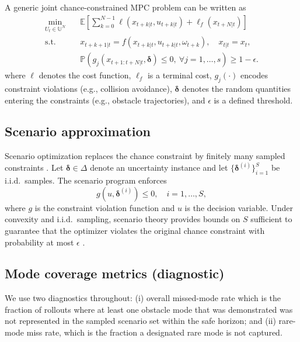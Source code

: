 \documentclass[letterpaper,10pt,conference]{ieeeconf}
\begin{document}
A generic joint chance-constrained MPC problem can be written as
\begin{subequations}\label{eq:cc_mpc}
\begin{align}
\min_{U_t\in\mathbb{U}^N}\quad &
\mathbb{E}\!\left[\sum_{k=0}^{N-1} \ell(x_{t+k|t},u_{t+k|t}) + \ell_f(x_{t+N|t})\right] \\
\text{s.t.}\quad &
x_{t+k+1|t}=f(x_{t+k|t},u_{t+k|t},\omega_{t+k}),\quad x_{t|t}=x_t,\\
& \mathbb{P}\!\left(g_j(x_{t+1:t+N|t},\boldsymbol{\delta})\le 0,\ \forall j=1,\dots,s\right) \ge 1-\epsilon.
\end{align}
\end{subequations}
where $\ell$ denotes the cost function, $\ell_f$ is a terminal cost, $g_j(\cdot)$ encodes constraint violations (e.g., collision avoidance), $\boldsymbol{\delta}$ denotes the random quantities entering the constraints (e.g., obstacle trajectories), and $\epsilon$ is a defined threshold.

\subsection{Scenario approximation}

Scenario optimization replaces the chance constraint by finitely many sampled constraints \cite{Cal2006ScenarioApproach,Ca2018ScenarioTheory}. Let $\boldsymbol{\delta}\in\Delta$ denote an uncertainty instance and let $\{\boldsymbol{\delta}^{(i)}\}_{i=1}^S$ be i.i.d.\ samples. The scenario program enforces
\begin{equation}\label{eq:scenario_generic}
g(u,\boldsymbol{\delta}^{(i)}) \le 0,\quad i=1,\dots,S,
\end{equation}
where $g$ is the constraint violation function and $u$ is the decision variable. Under convexity and i.i.d.\ sampling, scenario theory provides bounds on $S$ sufficient to guarantee that the optimizer violates the original chance constraint with probability at most $\epsilon$ \cite{Cal2006ScenarioApproach,Ca2018ScenarioTheory}.

\subsection{Mode coverage metrics (diagnostic)}\label{sec:metrics_prelim}

We use two diagnostics throughout:
(i) overall missed-mode rate which is the fraction of rollouts where at least one obstacle mode that was demonstrated was not represented in the sampled scenario set within the safe horizon; and
(ii) rare-mode miss rate, which is the fraction a designated rare mode is not captured.
\end{document}
